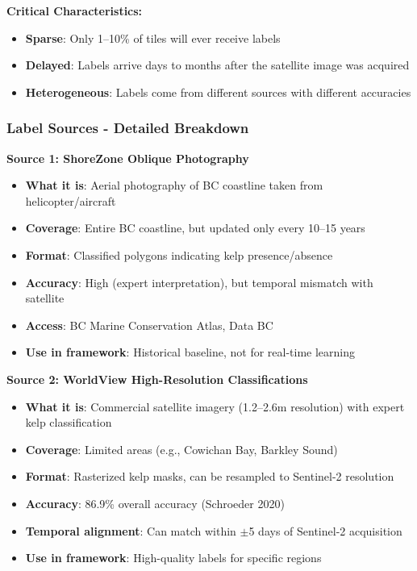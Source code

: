 \documentclass[11pt]{article}
\begin{document}
\textbf{Critical Characteristics:}
\begin{itemize}
    \item \textbf{Sparse}: Only 1--10\% of tiles will ever receive labels
    \item \textbf{Delayed}: Labels arrive days to months after the satellite image was acquired
    \item \textbf{Heterogeneous}: Labels come from different sources with different accuracies
\end{itemize}

\subsubsection{Label Sources - Detailed Breakdown}

\textbf{Source 1: ShoreZone Oblique Photography}
\begin{itemize}
    \item \textbf{What it is}: Aerial photography of BC coastline taken from helicopter/aircraft
    \item \textbf{Coverage}: Entire BC coastline, but updated only every 10--15 years
    \item \textbf{Format}: Classified polygons indicating kelp presence/absence
    \item \textbf{Accuracy}: High (expert interpretation), but temporal mismatch with satellite
    \item \textbf{Access}: BC Marine Conservation Atlas, Data BC
    \item \textbf{Use in framework}: Historical baseline, not for real-time learning
\end{itemize}

\textbf{Source 2: WorldView High-Resolution Classifications}
\begin{itemize}
    \item \textbf{What it is}: Commercial satellite imagery (1.2--2.6m resolution) with expert kelp classification
    \item \textbf{Coverage}: Limited areas (e.g., Cowichan Bay, Barkley Sound)
    \item \textbf{Format}: Rasterized kelp masks, can be resampled to Sentinel-2 resolution
    \item \textbf{Accuracy}: 86.9\% overall accuracy (Schroeder 2020)
    \item \textbf{Temporal alignment}: Can match within $\pm$5 days of Sentinel-2 acquisition
    \item \textbf{Use in framework}: High-quality labels for specific regions
\end{itemize}
\end{document}
